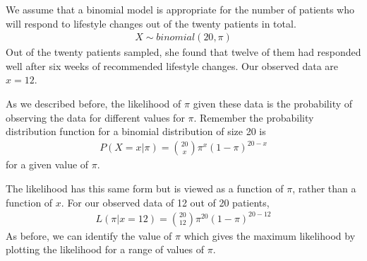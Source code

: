 \documentclass[letterpaper,10pt,english]{jupyterBook}
\begin{document}
\sphinxAtStartPar
{} We assume that a binomial model is appropriate for the number of patients who will respond to lifestyle changes out of the twenty patients in total.
\begin{equation*}
\begin{split} X \sim binomial(20, \pi) \end{split}
\end{equation*}
\sphinxAtStartPar
{} Out of the twenty patients sampled, she found that twelve of them had responded well after six weeks of recommended lifestyle changes. Our observed data are \(x = 12\).

\sphinxAtStartPar
{} As we described before, the likelihood of \(\pi\) given these data is the probability of observing the data for different values for \(\pi\). Remember the probability distribution function for a binomial distribution of size 20 is
\begin{equation*}
\begin{split} 
P(X = x|\pi) = {20 \choose x} \pi^{x} (1-\pi)^{20 - x} 
\end{split}
\end{equation*}
\sphinxAtStartPar
for a given value of \(\pi\).

\sphinxAtStartPar
{} The likelihood has this same form but is viewed as a function of \(\pi\), rather than a function of \(x\). For our observed data of 12 out of 20 patients,
\begin{equation*}
\begin{split} 
L(\pi | x = 12) = {20 \choose 12} \pi^{20} (1-\pi)^{20 - 12} 
\end{split}
\end{equation*}
\sphinxAtStartPar
As before, we can identify the value of \(\pi\) which gives the maximum likelihood by plotting the likelihood for a range of values of \(\pi\).
\end{document}
